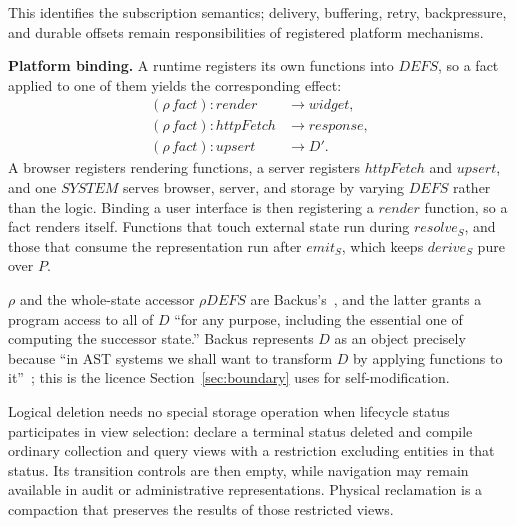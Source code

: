 \documentclass[10pt,twocolumn]{article}
\theoremstyle{plain}
\theoremstyle{definition}
\begin{document}
\noindent This identifies the subscription semantics; delivery, buffering, retry, backpressure, and durable offsets remain responsibilities of registered platform mechanisms.

\smallskip\noindent\textbf{Platform binding.} A runtime registers its own functions into $\mathit{DEFS}$, so a fact applied to one of them yields the corresponding effect:
\begin{align*}
(\rho\,\mathit{fact})\!:\!\mathit{render} &\to \mathit{widget}, \\
(\rho\,\mathit{fact})\!:\!\mathit{httpFetch} &\to \mathit{response}, \\
(\rho\,\mathit{fact})\!:\!\mathit{upsert} &\to D'.
\end{align*}
A browser registers rendering functions, a server registers $\mathit{httpFetch}$ and $\mathit{upsert}$, and one $\mathit{SYSTEM}$ serves browser, server, and storage by varying $\mathit{DEFS}$ rather than the logic. Binding a user interface is then registering a $\mathit{render}$ function, so a fact renders itself. Functions that touch external state run during $\mathit{resolve}_S$, and those that consume the representation run after $\mathit{emit}_S$, which keeps $\mathit{derive}_S$ pure over $P$.

\smallskip\noindent $\rho$ and the whole-state accessor $\rho\mathit{DEFS}$ are Backus's~\cite[Secs.\,13.3,\,14.3.3]{backus78}, and the latter grants a program access to all of $D$ ``for any purpose, including the essential one of computing the successor state.'' Backus represents $D$ as an object precisely because ``in AST systems we shall want to transform $D$ by applying functions to it''~\cite[Sec.\,13.3.5]{backus78}; this is the licence Section~\ref{sec:boundary} uses for self-modification.

\smallskip\noindent Logical deletion needs no special storage operation when lifecycle status participates in view selection: declare a terminal status deleted and compile ordinary collection and query views with a restriction excluding entities in that status. Its transition controls are then empty, while navigation may remain available in audit or administrative representations. Physical reclamation is a compaction that preserves the results of those restricted views.
\end{document}
